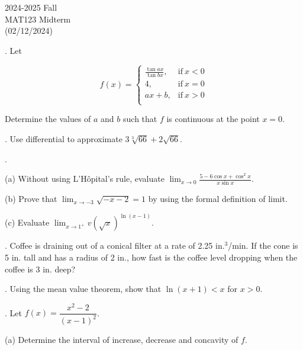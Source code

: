 \documentclass{article}
\begin{document}
\pagestyle{empty}
\large

\begin{center}
2024-2025 Fall \\MAT123 Midterm\\(02/12/2024)
\end{center}

. Let

\[
f(x) =
\begin{cases}
\displaystyle \frac{\tan ax}{\tan bx}, & \text{if}\ x < 0 \\[1em]
4, & \text{if}\ x = 0 \\[1em]
ax+b, & \text{if}\ x >0 \\
\end{cases}
\]

\hfill

\noindent Determine the values of $a$ and $b$ such that $f$ is continuous at the point $x=0$.

\hfill

. Use differential to approximate $3\sqrt[3]{66}+2\sqrt{66}$.

\hfill

.

\hfill

\noindent (a) Without using L'Hôpital's rule, evaluate $\displaystyle \lim_{x\to 0} \frac{5-6\cos x + \cos^2x}{x\sin x}$.

\hfill

\noindent (b) Prove that $\displaystyle \lim_{x\to -3} \sqrt{-x-2} = 1$ by using the formal definition of limit.

\hfill

\noindent (c) Evaluate $\displaystyle\lim_{x\to1^+}v\left(\sqrt x\right)^{\ln(x-1)}$.

\hfill

. Coffee is draining out of a conical filter at a rate of 2.25 in.$^3$/min. If the cone is 5 in. tall and has a radius of 2 in., how fast is the coffee level dropping when the coffee is 3 in. deep?

\hfill

. Using the mean value theorem, show that $\ln(x+1) < x$ for $x > 0$.

\hfill

. Let $f(x)=\dfrac{x^2-2}{(x-1)^2}$.

\hfill

(a) Determine the interval of increase, decrease and concavity of $f$.
\end{document}
